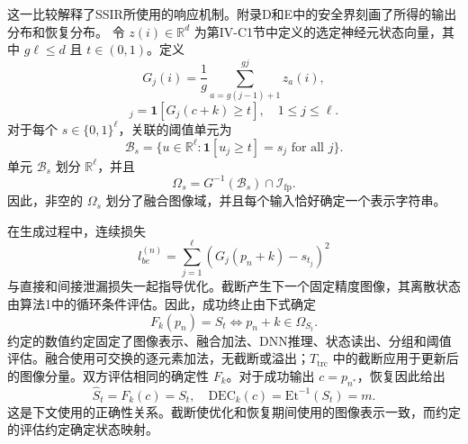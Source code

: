 \documentclass[UTF8,a4paper,zihao=-4,fontset=windows,openany]{ctexbook}
\begin{document}
这一比较解释了SSIR所使用的响应机制。附录D和E中的安全界刻画了所得的输出分布和恢复分布。
令 \(z(i) \in \mathbb{R}^d\) 为第IV-C1节中定义的选定神经元状态向量，其中 \(g\ell \le d\) 且 \(t \in (0,1)\)。定义
\begin{equation}
G_j(i) = \frac{1}{g} \sum_{a=g(j-1)+1}^{gj} z_a(i),
\end{equation}
\begin{equation}
[F_k(c)]_j = \mathbf{1}[G_j(c+k) \ge t], \quad 1 \le j \le \ell. \tag{23}
\end{equation}
对于每个 \(s \in \{0,1\}^\ell\)，关联的阈值单元为
\begin{equation}
\mathcal{B}_s = \{u \in \mathbb{R}^\ell : \mathbf{1}[u_j \ge t] = s_j \text{ for all } j\}. \tag{24}
\end{equation}
单元 \(\mathcal{B}_s\) 划分 \(\mathbb{R}^\ell\)，并且
\begin{equation}
\Omega_s = G^{-1}(\mathcal{B}_s) \cap \mathcal{I}_{\mathrm{fp}}. \tag{25}
\end{equation}
因此，非空的 \(\Omega_s\) 划分了融合图像域，并且每个输入恰好确定一个表示字符串。

在生成过程中，连续损失
\begin{equation}
l_{be}^{(n)} = \sum_{j=1}^\ell (G_j(p_n + k) - s_{t_j})^2 \tag{26}
\end{equation}
与直接和间接泄漏损失一起指导优化。截断产生下一个固定精度图像，其离散状态由算法1中的循环条件评估。因此，成功终止由下式确定
\begin{equation}
F_k(p_n) = S_t \iff p_n + k \in \Omega_{S_t}. \tag{27}
\end{equation}
约定的数值约定固定了图像表示、融合加法、DNN推理、状态读出、分组和阈值评估。融合使用可交换的逐元素加法，无截断或溢出；\(T_{\mathrm{trc}}\) 中的截断应用于更新后的图像分量。双方评估相同的确定性 \(F_k\)。对于成功输出 \(c = p_{n^*}\)，恢复因此给出
\begin{equation}
\widehat{S}_t = F_k(c) = S_t, \quad \mathrm{DEC}_k(c) = \mathrm{Et}^{-1}(S_t) = m. \tag{28}
\end{equation}
这是下文使用的正确性关系。截断使优化和恢复期间使用的图像表示一致，而约定的评估约定确定状态映射。

\end{document}
